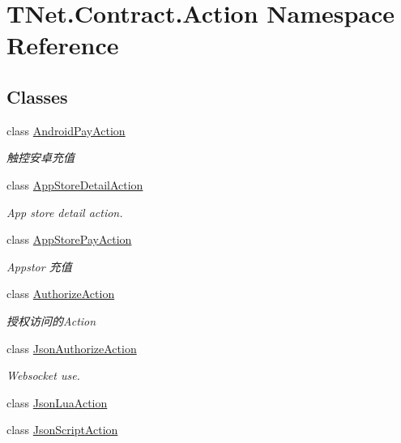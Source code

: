 \hypertarget{namespace_t_net_1_1_contract_1_1_action}{}\section{T\+Net.\+Contract.\+Action Namespace Reference}
\label{namespace_t_net_1_1_contract_1_1_action}
\subsection*{Classes}
\begin{DoxyCompactItemize}
\item 
class \mbox{\hyperlink{class_t_net_1_1_contract_1_1_action_1_1_android_pay_action}{Android\+Pay\+Action}}
\begin{DoxyCompactList}\small\item\em 触控安卓充值 \end{DoxyCompactList}\item 
class \mbox{\hyperlink{class_t_net_1_1_contract_1_1_action_1_1_app_store_detail_action}{App\+Store\+Detail\+Action}}
\begin{DoxyCompactList}\small\item\em App store detail action. \end{DoxyCompactList}\item 
class \mbox{\hyperlink{class_t_net_1_1_contract_1_1_action_1_1_app_store_pay_action}{App\+Store\+Pay\+Action}}
\begin{DoxyCompactList}\small\item\em Appstor 充值 \end{DoxyCompactList}\item 
class \mbox{\hyperlink{class_t_net_1_1_contract_1_1_action_1_1_authorize_action}{Authorize\+Action}}
\begin{DoxyCompactList}\small\item\em 授权访问的\+Action \end{DoxyCompactList}\item 
class \mbox{\hyperlink{class_t_net_1_1_contract_1_1_action_1_1_json_authorize_action}{Json\+Authorize\+Action}}
\begin{DoxyCompactList}\small\item\em Websocket use. \end{DoxyCompactList}\item 
class \mbox{\hyperlink{class_t_net_1_1_contract_1_1_action_1_1_json_lua_action}{Json\+Lua\+Action}}
\item 
class \mbox{\hyperlink{class_t_net_1_1_contract_1_1_action_1_1_json_script_action}{Json\+Script\+Action}}

\end{DoxyCompactItemize}
